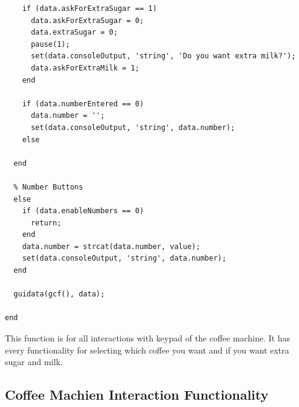 \documentclass[a4paper, 10pt]{article}
\begin{document}
\begin{lstlisting}
    if (data.askForExtraSugar == 1)
      data.askForExtraSugar = 0;
      data.extraSugar = 0;
      pause(1);
      set(data.consoleOutput, 'string', 'Do you want extra milk?');
      data.askForExtraMilk = 1;
    end

    if (data.numberEntered == 0)
      data.number = '';
      set(data.consoleOutput, 'string', data.number);
    else

  end

  % Number Buttons
  else
    if (data.enableNumbers == 0)
      return;
    end
    data.number = strcat(data.number, value);
    set(data.consoleOutput, 'string', data.number);
  end

  guidata(gcf(), data);

end
			\end{lstlisting}
			\noindent This function is for all interactions with keypad of the coffee machine. It has every functionality for selecting which coffee you want and if you want extra sugar and milk. 
		\subsection{Coffee Machien Interaction Functionality}
\end{document}
